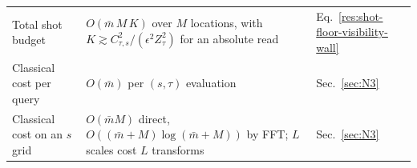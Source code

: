 \begin{table}[tb]
\begin{ruledtabular}
\begin{tabular}{lll}
\parbox[t]{0.22\textwidth}{\raggedright Total shot budget\strut} & \parbox[t]{0.40\textwidth}{\raggedright $O(\bar m\,M\,K)$ over $M$ locations, with $K\gtrsim C_{\tau,s}^2/(\epsilon^2 Z_\tau^2)$ for an absolute read\strut} & Eq.~\eqref{res:shot-floor-visibility-wall} \\[6pt]
\parbox[t]{0.22\textwidth}{\raggedright Classical cost per query\strut} & $O(\bar m)$ per $(s,\tau)$ evaluation & Sec.~\ref{sec:N3} \\[6pt]
\parbox[t]{0.22\textwidth}{\raggedright Classical cost on an $s$ grid\strut} & \parbox[t]{0.40\textwidth}{\raggedright $O(\bar m M)$ direct, $O((\bar m+M)\log(\bar m+M))$ by FFT; $L$ scales cost $L$ transforms\strut} & Sec.~\ref{sec:N3} \\
\end{tabular}
\end{ruledtabular}
\end{table}
